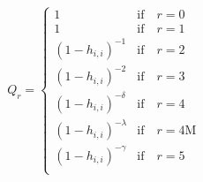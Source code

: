 \begin{equation}
	Q_{r}
	=
	\begin{cases} 
		1 
		  &   
		\text{if} 
		\quad 
		r = 0 \\
		1 
		  &   
		\text{if} 
		\quad 
		r = 1 \\
		\left( 1 - h_{i, i} \right)^{-1} 
		  &   
		\text{if} 
		\quad 
		r = 2 \\
		\left( 1 - h_{i, i} \right)^{-2} 
		  &   
		\text{if} 
		\quad 
		r = 3 \\
		\left( 1 - h_{i, i} \right)^{- \delta} 
		  &   
		\text{if} 
		\quad 
		r = 4 \\
		\left( 1 - h_{i, i} \right)^{- \lambda} 
		  &   
		\text{if} 
		\quad 
		r = 4\mathrm{M} \\
		\left( 1 - h_{i, i} \right)^{- \gamma} 
		  &   
		\text{if} 
		\quad 
		r = 5 \\
	\end{cases}
\end{equation}
